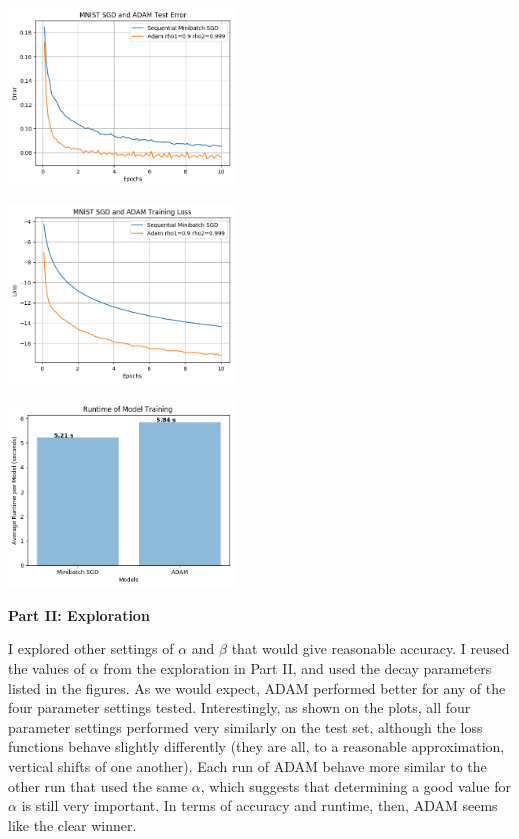 \documentclass[10pt]{article}
\begin{document}
\begin{multicols}{2}
\begin{center}
    \includegraphics[width=0.45\textwidth]{SGDandADAMTestError.png}
\end{center}
\begin{center}
    \includegraphics[width=0.45\textwidth]{SGDandADAMTrainingLoss.png}
\end{center} 

\begin{center}
    \includegraphics[width=0.45\textwidth]{train_time_part3.png}
\end{center}
\noindent
\textbf{Part II: Exploration} \par
I explored other settings of $\alpha$ and $\beta$ that would give reasonable accuracy. I reused the values of $\alpha$ from the exploration in Part II, and used the decay parameters listed in the figures. As we would expect, ADAM performed better for any of the four parameter settings tested. Interestingly, as shown on the plots, all four parameter settings performed very similarly on the test set, although the loss functions behave slightly differently (they are all, to a reasonable approximation, vertical shifts of one another). Each run of ADAM behave more similar to the other run that used the same $\alpha$, which suggests that determining a good value for $\alpha $ is still very important. In terms of accuracy and runtime, then, ADAM seems like the clear winner.\par


\end{multicols}
\end{document}
